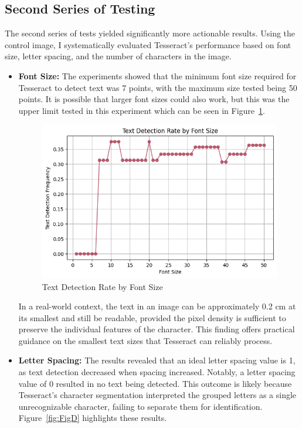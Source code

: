 \documentclass[10pt,twocolumn]{article}
\begin{document}
\subsection{Second Series of Testing}
The second series of tests yielded significantly more actionable results. Using the control image, I systematically evaluated Tesseract’s performance based on font size, letter spacing, and the number of characters in the image.

\begin{itemize}
\item \textbf{Font Size:} The experiments showed that the minimum font size required for Tesseract to detect text was 7 points, with the maximum size tested being 50 points. It is possible that larger font sizes could also work, but this was the upper limit tested in this experiment which can be seen in Figure~\ref{fig:FigC}. 
\begin{figure}[h!]
    \centering
    \includegraphics[width=\linewidth]{Figures/Figure_C.png}
    \caption{Text Detection Rate by Font Size}
    \label{fig:FigC}
\end{figure}
In a real-world context, the text in an image can be approximately 0.2 cm at its smallest and still be readable, provided the pixel density is sufficient to preserve the individual features of the character. This finding offers practical guidance on the smallest text sizes that Tesseract can reliably process.
\item \textbf{Letter Spacing:} The results revealed that an ideal letter spacing value is 1, as text detection decreased when spacing increased. Notably, a letter spacing value of 0 resulted in no text being detected. This outcome is likely because Tesseract’s character segmentation interpreted the grouped letters as a single unrecognizable character, failing to separate them for identification. Figure~\ref{fig:FigD} highlights these results. 

\end{itemize}
\end{document}

